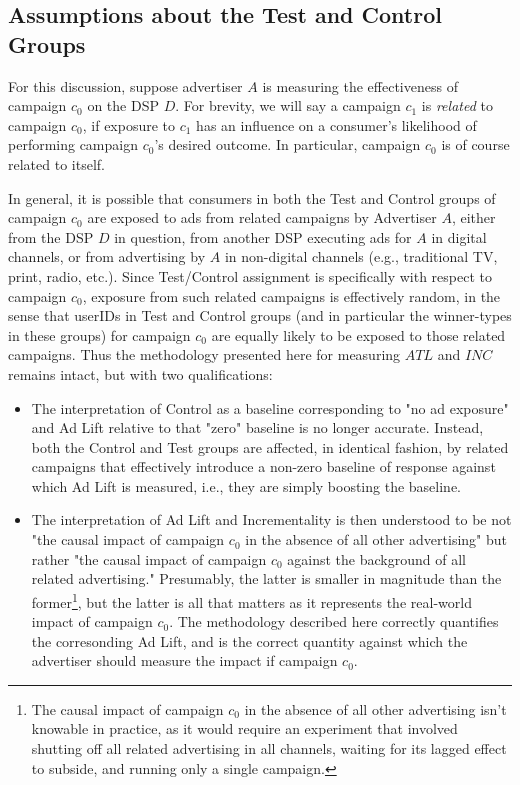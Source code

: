 \documentclass[11pt,a4paper]{article}
\theoremstyle{definition}
\theoremstyle{remark}
\theoremstyle{definition}
\theoremstyle{definition}
\theoremstyle{definition}
\theoremstyle{definition}
\theoremstyle{definition}
\theoremstyle{definition}
\begin{document}
\subsection{Assumptions about the Test and Control Groups}

For this discussion, suppose advertiser $A$ is measuring the effectiveness of campaign $c_0$ on the DSP $D$. For brevity, we will say a campaign $c_1$ is \textit{related} to campaign $c_0$, if exposure to $c_1$ has an influence on a consumer's likelihood of performing campaign $c_0$'s desired outcome. In particular, campaign $c_0$ is of course related to itself. 

In general, it is possible that consumers in both the Test and Control groups of campaign $c_0$ are exposed to ads from related campaigns by Advertiser $A$, either from the DSP $D$ in question, from another DSP executing ads for $A$ in digital channels, or from advertising by $A$ in non-digital channels (e.g., traditional TV, print, radio, etc.). Since Test/Control assignment is specifically with respect to campaign $c_0$, exposure from such related campaigns is effectively random, in the sense that userIDs in Test and Control groups (and in particular the winner-types in these groups) for campaign $c_0$ are equally likely to be exposed to those related campaigns. Thus the methodology presented here for measuring $ATL$ and $INC$ remains intact, but with two qualifications:

\begin{itemize}
	\item The interpretation of Control as a baseline corresponding to "no ad exposure" and Ad Lift relative to that "zero" baseline is no longer accurate. Instead, both the Control and Test groups are affected, in identical fashion, by related campaigns that effectively introduce a non-zero baseline of response against which Ad Lift is measured, i.e., they are simply boosting the baseline. 
	\item The interpretation of Ad Lift and Incrementality is then understood to be not "the causal impact of campaign $c_0$ in the absence of all other advertising" but rather "the causal impact of campaign $c_0$ against the background of all related advertising." Presumably, the latter is smaller in magnitude than the former\footnote{The causal impact of campaign $c_0$ in the absence of all other advertising isn't knowable in practice, as it would require an experiment that involved shutting off all related advertising in all channels, waiting for its lagged effect to subside, and running only a single campaign.}, but the latter is all that matters as it represents the real-world impact of campaign $c_0$. The methodology described here correctly quantifies the corresonding Ad Lift, and is the correct quantity against which the advertiser should measure the impact if campaign $c_0$. 
\end{itemize}
\end{document}
